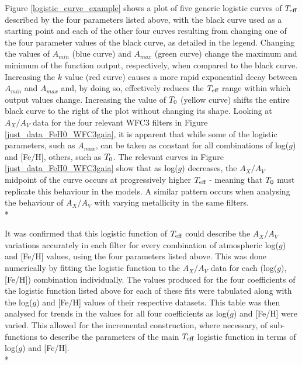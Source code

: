 \documentclass[12pt, a4paper]{report}
\begin{document}
Figure \ref{logistic_curve_example} shows a plot of five generic logistic curves of $T_{\textnormal{eff}}$ described by the four parameters listed above, with the black curve used as a starting point and each of the other four curves resulting from changing one of the four parameter values of the black curve, as detailed in the legend. Changing the values of $A_{min}$ (blue curve) and $A_{max}$ (green curve) change the maximum and minimum of the function output, respectively, when compared to the black curve. Increasing the $k$ value (red curve) causes a more rapid exponential decay between $A_{min}$ and $A_{max}$ and, by doing so, effectively reduces the $T_{\textnormal{eff}}$ range within which output values change. Increasing the value of $T_{\textnormal{0}}$ (yellow curve) shifts the entire black curve to the right of the plot without changing its shape. Looking at $A_{X}/A_{V}$ data for the four relevant WFC3 filters in Figure \ref{just_data_FeH0_WFC3gaia}, it is apparent that while some of the logistic parameters, such as $A_{max}$, can be taken as constant for all combinations of log($g$) and [Fe/H], others, such as $T_{\textnormal{0}}$. The relevant curves in Figure \ref{just_data_FeH0_WFC3gaia} show that as log($g$) decreases, the $A_{X}/A_{V}$ midpoint of the curve occurs at progressively higher $T_{\textnormal{eff}}$ - meaning that $T_{\textnormal{0}}$ must replicate this behaviour in the models. A similar pattern occurs when analysing the behaviour of $A_{X}/A_{V}$ with varying metallicity in the same filters. \\*

It was confirmed that this logistic function of $T_{\textnormal{eff}}$ could describe the $A_{X}/A_{V}$ variations accurately in each filter for every combination of atmospheric log($g$) and [Fe/H] values, using the four parameters listed above. This was done numerically by fitting the logistic function to the $A_{X}/A_{V}$ data for each (log($g$),[Fe/H]) combination individually. The values produced for the four coefficients of the logistic function listed above for each of these fits were tabulated along with the log($g$) and [Fe/H] values of their respective datasets. This table was then analysed for trends in the values for all four coefficients as log($g$) and [Fe/H] were varied. This allowed for the incremental construction, where necessary, of sub-functions to describe the parameters of the main $T_{\textnormal{eff}}$ logistic function in terms of log($g$) and [Fe/H].\\*
\end{document}
